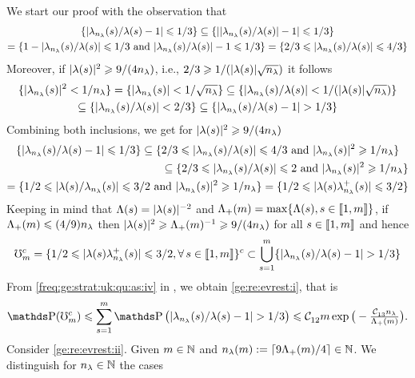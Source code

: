 \begin{pro}
We start our proof with the observation that  
\begin{multline*}
\{|\hfedf[(s)]/\fedf[(s)]-1|\leq1/3\}\subseteq
\{||\hfedf[(s)]/\fedf[(s)]|-1|\leq1/3\}\\\hfill=\{1-|\hfedf[(s)]/\fedf[(s)]|\leq1/3\text{
  and  }|\hfedf[(s)]/\fedf[(s)]|-1\leq1/3\}
=\{2/3\leq|\hfedf[(s)]/\fedf[(s)]|\leq4/3\}
\end{multline*}
Moreover, if
$|\fedf[(s)]|^2\geq 9/(4\ssE)$, i.e., $2/3\geq1/(|\fedf[(s)]|\sqrt{\ssE})$ it follows
\begin{multline*}
\{|\hfedf[(s)]|^2< 1/\ssE\}=\{|\hfedf[(s)]|<
1/\sqrt{\ssE}\}\subseteq\{|\hfedf[(s)]/\fedf[(s)]|<1/(|\fedf[(s)]|\sqrt{\ssE})\}\\
\subseteq\{|\hfedf[(s)]/\fedf[(s)]|< 2/3\}\subseteq\{|\hfedf[(s)]/\fedf[(s)]-1|>1/3\}
\end{multline*}
Combining both inclusions, we get for $|\fedf[(s)]|^2\geq 9/(4\ssE)$
\begin{multline*}
\{|\hfedf[(s)]/\fedf[(s)]-1|\leq1/3\}\subseteq
\{2/3\leq |\hfedf[(s)]/\fedf[(s)]|\leq4/3\text{ and
  }|\hfedf[(s)]|^2\geq 1/\ssE\}
\\\hfill\subseteq\{2/3\leq |\hfedf[(s)]/\fedf[(s)]|\leq2\text{ and
  }|\hfedf[(s)]|^2\geq 1/\ssE\}\\
=\{1/2\leq |\fedf[(s)]/\hfedf[(s)]|\leq3/2\text{ and }|\hfedf[(s)]|^2\geq 1/\ssE\}=\{1/2\leq |\fedf[(s)]\hfedfmpI[(s)]|\leq3/2\}
\end{multline*}
Keeping in mind that  $\iSv[s]=|\fedf[(s)]|^{-2}$ and
$\miSv=\max\{\iSv[s],s\in\nset{1,\Di}\}$, if $\miSv\leq
(4/9)\ssE$ then $|\fedf[(s)]|^{2}\geq \miSv^{-1}\geq9/(4\ssE)$ for all
$s\in\nset{1,\Di}$ and hence 
\begin{equation*}
  \aixEv^c=\{1/2\leq
  |\fedf[(s)]\hfedfmpI[(s)]|\leq3/2,\forall\,s\in\nset{1,\Di}\}^c\subset\bigcup_{s=1}^{\Di}\{|\hfedf[(s)]/\fedf[(s)]-1|>1/3\}
\end{equation*}
From \ref{freq:ge:strat:uk:qu:as:iv} in , we obtain \ref{ge:re:evrest:i}, that is
\begin{equation*}
  \P(\aixEv^c)\leq
  \sum_{s=1}^{\Di}\P\big(|\hfedf[(s)]/\fedf[(s)]-1|>1/3\big)\leq \cst{12}\Di\exp\big(-\tfrac{\cst{13}\ssE}{\miSv[m]}\big).
\end{equation*}
Consider \ref{ge:re:evrest:ii}. Given  $\Di\in\Nz$ and
$\ssE(\Di):=\ceil{9\miSv/4}\in\Nz$. We distinguish for $\ssE\in\Nz$ the cases \begin{inparaenum}[i]\renewcommand{\theenumi}{\dgrau\rm(\alph{enumi})}\item\label{pro:evrest:ii:c1}

\end{inparaenum}
\end{pro}
